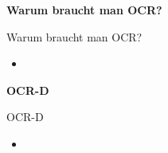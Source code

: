 \documentclass{bbawslides}
\begin{document}
\begin{bbawpart}{\Large\bf Warum braucht man OCR?}
\end{bbawpart}

\begin{bbawslide}{Warum braucht man OCR?}
  \vspace*{7mm}%
  \centerslidestrue%
  \begin{itemize}
    \item
  \end{itemize}
\end{bbawslide}

\begin{bbawpart}{\Large\bf OCR-D}
\end{bbawpart}

\begin{bbawslide}{OCR-D}
  \vspace*{7mm}%
  \centerslidestrue%
  \begin{itemize}
    \item
  \end{itemize}
\end{bbawslide}
\end{document}
